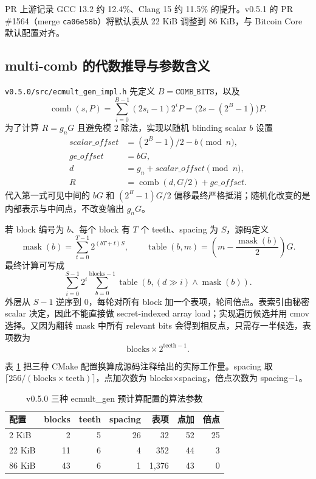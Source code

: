 \documentclass[11pt,a4paper,fontset=none]{ctexart}
\begin{document}
PR 上游记录 GCC 13.2 约 12.4\%、Clang 15 约 11.5\% 的提升。v0.5.1 的 PR \#1564（merge \texttt{ca06e58b}）将默认表从 22 KiB 调整到 86 KiB，与 Bitcoin Core 默认配置对齐。

\subsection{multi-comb 的代数推导与参数含义}

\texttt{v0.5.0/src/ecmult\_gen\_impl.h} 先定义 $B=\texttt{COMB\_BITS}$，以及
\[
\operatorname{comb}(s,P)=\sum_{i=0}^{B-1}(2s_i-1)2^iP
=\bigl(2s-(2^B-1)\bigr)P.
\]
为了计算 $R=g_nG$ 且避免模 2 除法，实现以随机 blinding scalar $b$ 设置
\begin{align*}
\textit{scalar\_offset}&=(2^B-1)/2-b\pmod n,\\
\textit{ge\_offset}&=bG,\\
d&=g_n+\textit{scalar\_offset}\pmod n,\\
R&=\operatorname{comb}(d,G/2)+\textit{ge\_offset}.
\end{align*}
代入第一式可见中间的 $bG$ 和 $(2^B-1)G/2$ 偏移最终严格抵消；随机化改变的是内部表示与中间点，不改变输出 $g_nG$。

若 block 编号为 $b$、每个 block 有 $T$ 个 teeth、spacing 为 $S$，源码定义
\[
\operatorname{mask}(b)=\sum_{t=0}^{T-1}2^{(bT+t)S},\qquad
\operatorname{table}(b,m)=\left(m-\frac{\operatorname{mask}(b)}{2}\right)G.
\]
最终计算可写成
\[
\sum_{i=0}^{S-1}2^i
\sum_{b=0}^{\mathrm{blocks}-1}
\operatorname{table}\!\left(b,(d\!\gg\! i)\land\operatorname{mask}(b)\right).
\]
外层从 $S-1$ 逆序到 0，每轮对所有 block 加一个表项，轮间倍点。表索引由秘密 scalar 决定，因此不能直接做 secret-indexed array load；实现遍历候选并用 cmov 选择。又因为翻转 mask 中所有 relevant bits 会得到相反点，只需存一半候选，表项数为
\[
\mathrm{blocks}\times 2^{\mathrm{teeth}-1}.
\]

表 \ref{tab:comb-parameters} 把三种 CMake 配置换算成源码注释给出的实际工作量。spacing 取 $\lceil256/(\mathrm{blocks}\times\mathrm{teeth})\rceil$，点加次数为 blocks$\times$spacing，倍点次数为 spacing$-1$。

\begin{table}[htbp]
\centering
\caption{v0.5.0 三种 ecmult\_gen 预计算配置的算法参数}
\label{tab:comb-parameters}
\begin{tabular}{lrrrrrr}
\toprule
配置 & blocks & teeth & spacing & 表项 & 点加 & 倍点 \\
\midrule
2 KiB  & 2  & 5 & 26 & 32   & 52 & 25 \\
22 KiB & 11 & 6 & 4  & 352  & 44 & 3 \\
86 KiB & 43 & 6 & 1  & 1,376 & 43 & 0 \\
\bottomrule
\end{tabular}
\end{table}
\end{document}
